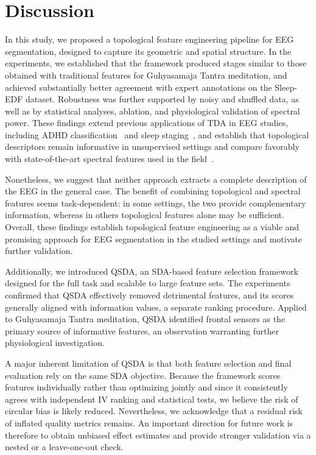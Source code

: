 \documentclass[pdflatex,sn-basic,Numbered]{sn-jnl}
\begin{document}
\section{Discussion}

In this study, we proposed a topological feature engineering pipeline for EEG segmentation, designed to capture its geometric and spatial structure. In the experiments, we established that the framework produced stages similar to those obtained with traditional features for Guhyasamaja Tantra meditation, and achieved substantially better agreement with expert annotations on the Sleep-EDF dataset. Robustness was further supported by noisy and shuffled data, as well as by statistical analyses, ablation, and physiological validation of spectral power. These findings extend previous applications of TDA in EEG studies, including ADHD classification~\cite{cai2024topologicalfeaturesearchmethod} and sleep staging~\cite{deng2024twostagehierarchicalexplainablefeature}, and establish that topological descriptors remain informative in unsupervised settings and compare favorably with state-of-the-art spectral features used in the field~\cite{SDA}.

Nonetheless, we suggest that neither approach extracts a complete description of the EEG in the general case. The benefit of combining topological and spectral features seems task-dependent: in some settings, the two provide complementary information, whereas in others topological features alone may be sufficient. Overall, these findings establish topological feature engineering as a viable and promising approach for EEG segmentation in the studied settings and motivate further validation.

Additionally, we introduced QSDA, an SDA-based feature selection framework designed for the full task and scalable to large feature sets. The experiments confirmed that QSDA effectively removed detrimental features, and its scores generally aligned with information values, a separate ranking procedure. Applied to Guhyasamaja Tantra meditation, QSDA identified frontal sensors as the primary source of informative features, an observation warranting further physiological investigation.

A major inherent limitation of QSDA is that both feature selection and final evaluation rely on the same SDA objective. Because the framework scores features individually rather than optimizing jointly and since it consistently agrees with independent IV ranking and statistical tests, we believe the risk of circular bias is likely reduced. Nevertheless, we acknowledge that a residual risk of inflated quality metrics remains. An important direction for future work is therefore to obtain unbiased effect estimates and provide stronger validation via a nested or a leave-one-out check.
\end{document}
